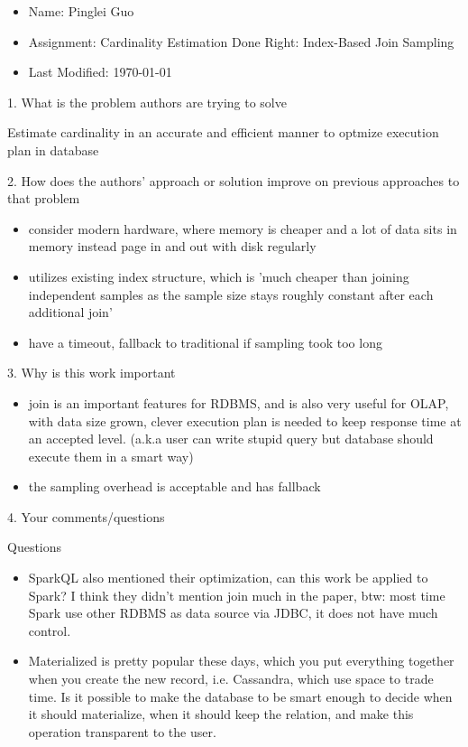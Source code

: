 \documentclass[12pt,a4paper,oneside]{article}
\begin{document}
\begin{itemize}
  \item Name: Pinglei Guo
  \item Assignment: Cardinality Estimation Done Right: Index-Based Join Sampling
  \item Last Modified: \today
\end{itemize}

1. What is the problem authors are trying to solve

\medskip

Estimate cardinality in an accurate and efficient manner to optmize execution plan in database

\bigskip

2. How does the authors’ approach or solution improve on previous approaches to that problem

\medskip

\begin{itemize}
  \item consider modern hardware, where memory is cheaper and a lot of data sits in memory instead page in and out with disk regularly
  \item utilizes existing index structure, which is 'much cheaper than joining independent samples as the sample size stays roughly constant after each additional join'
  \item have a timeout, fallback to traditional if sampling took too long
\end{itemize}

\bigskip

3. Why is this work important

\medskip

\begin{itemize}
  \item join is an important features for RDBMS, and is also very useful for OLAP, with data size grown, clever execution plan
  is needed to keep response time at an accepted level. (a.k.a user can write stupid query but database should execute them in a smart way)
  \item the sampling overhead is acceptable and has fallback
\end{itemize}

\bigskip

4. Your comments/questions

\medskip

Questions

\begin{itemize}
  \item SparkQL also mentioned their optimization, can this work be applied to Spark? I think they didn't mention join much in the paper,
  btw: most time Spark use other RDBMS as data source via JDBC, it does not have much control.
  \item Materialized is pretty popular these days, which you put everything together when you create the new record, i.e. Cassandra,
  which use space to trade time. Is it possible to make the database to be smart enough to decide when it should materialize, when it
  should keep the relation, and make this operation transparent to the user.
\end{itemize}
\end{document}
